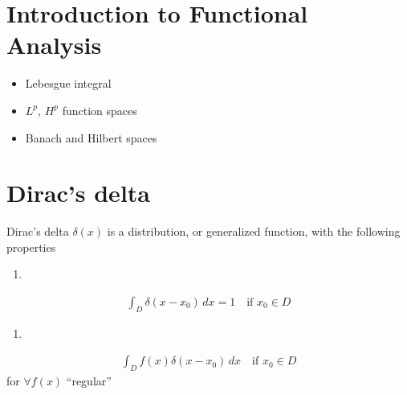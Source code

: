 \documentclass[letterpaper,10pt,english]{jupyterBook}
\begin{document}
\chapter{Introduction to Functional Analysis}
\label{\detokenize{ch/functional-analysis/intro:introduction-to-functional-analysis}}\label{\detokenize{ch/functional-analysis/intro:functional-analysis}}\label{\detokenize{ch/functional-analysis/intro::doc}}\begin{itemize}
\item {} 
\sphinxAtStartPar
Lebesgue integral

\item {} 
\sphinxAtStartPar
\(L^p\), \(H^p\) function spaces

\item {} 
\sphinxAtStartPar
Banach and Hilbert spaces

\end{itemize}

\sphinxstepscope


\chapter{Dirac’s delta}
\label{\detokenize{ch/functional-analysis/dirac-delta:dirac-s-delta}}\label{\detokenize{ch/functional-analysis/dirac-delta:functional-analysis-dirac-delta}}\label{\detokenize{ch/functional-analysis/dirac-delta::doc}}
\sphinxAtStartPar
Dirac’s delta \(\delta(x)\) is a distribution, or generalized function, with the following properties
\begin{enumerate}
%
\item {} 
\end{enumerate}
\begin{equation}\label{equation:ch/functional-analysis/dirac-delta:dirac-delta:prop-1}
\begin{split}\int_{D} \delta(x-x_0) \, dx = 1  \quad \text{if $x_0 \in D$}\end{split}
\end{equation}\begin{enumerate}
%
\setcounter{enumi}{1}
\item {} 
\end{enumerate}
\begin{equation}\label{equation:ch/functional-analysis/dirac-delta:dirac-delta:prop-2}
\begin{split}\int_{D} f(x) \delta(x-x_0) \, dx \quad \text{if $x_0 \in D$}\end{split}
\end{equation}
\sphinxAtStartPar
for \(\forall f(x)\) “regular”  
\end{document}
